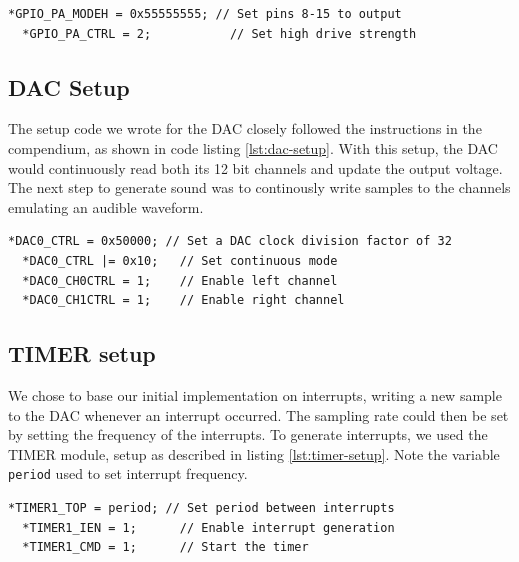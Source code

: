 \noindent\begin{minipage}[c]{\textwidth}
  \begin{lstlisting}[caption=Setting GPIO pins 8-15 as output,label={lst:gpio-setup2}]
  *GPIO_PA_MODEH = 0x55555555; // Set pins 8-15 to output
  *GPIO_PA_CTRL = 2;           // Set high drive strength
  \end{lstlisting}
\end{minipage}


\subsection{DAC Setup}
The setup code we wrote for the DAC closely followed the instructions in the compendium, as shown in code listing \ref{lst:dac-setup}. With this setup, the DAC would continuously read both its 12 bit channels and update the output voltage. The next step to generate sound was to continously write samples to the channels emulating an audible waveform.\\

\noindent\begin{minipage}[c]{\textwidth}
  \begin{lstlisting}[caption=Setting up the DAC,label={lst:dac-setup}]
  *DAC0_CTRL = 0x50000; // Set a DAC clock division factor of 32
  *DAC0_CTRL |= 0x10;   // Set continuous mode
  *DAC0_CH0CTRL = 1;    // Enable left channel
  *DAC0_CH1CTRL = 1;    // Enable right channel
  \end{lstlisting}
\end{minipage}

\subsection{TIMER setup}
We chose to base our initial implementation on interrupts, writing a new sample to the DAC whenever an interrupt occurred. The sampling rate could then be set by setting the frequency of the interrupts. To generate interrupts, we used the TIMER module, setup as described in listing \ref{lst:timer-setup}. Note the variable \texttt{period} used to set interrupt frequency. \\

\noindent\begin{minipage}[c]{\textwidth}
  \begin{lstlisting}[caption=Setting up the timer to generate interrupts,label={lst:timer-setup}]
  *TIMER1_TOP = period; // Set period between interrupts
  *TIMER1_IEN = 1;      // Enable interrupt generation
  *TIMER1_CMD = 1;      // Start the timer
  \end{lstlisting}
\end{minipage}

